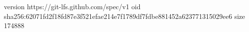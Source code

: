 version https://git-lfs.github.com/spec/v1
oid sha256:62071fd2f18fd87e3f521efae214e7f1789df7fdbe881452a623771315029ee6
size 174888
